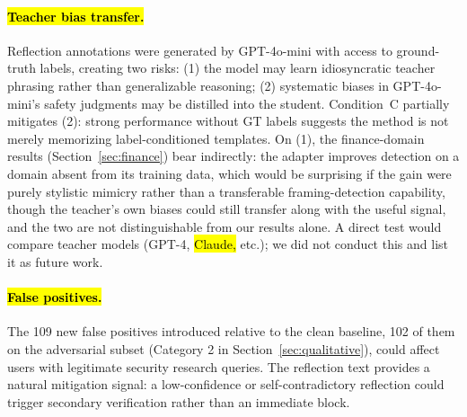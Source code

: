 \documentclass[superintelligence,article,accept,moreauthors]{Definitions/mdpi}
\begin{document}
\paragraph{\hl{Teacher bias transfer.} %
}
Reflection annotations were generated by GPT-4o-mini with access to ground-truth labels, creating two risks: (1) the model may learn idiosyncratic teacher phrasing rather than generalizable reasoning; (2) systematic biases in GPT-4o-mini's safety judgments may be distilled into the student. Condition~C partially mitigates (2): strong performance without GT labels suggests the method is not merely memorizing label-conditioned templates. On (1), the finance-domain results (Section~\ref{sec:finance}) bear indirectly: the adapter improves detection on a domain absent from its training data, which would be surprising if the gain were purely stylistic mimicry rather than a transferable framing-detection capability, though the teacher's own biases could still transfer along with the useful signal, and the two are not distinguishable from our results alone. A direct test would compare teacher models (GPT-4, \hl{Claude,} %
 etc.); we did not conduct this and list it as future work.

\paragraph{\hl{False positives.}}
The 109 new false positives introduced relative to the clean baseline, 102 of them on the adversarial subset (Category 2 in Section~\ref{sec:qualitative}), could affect users with legitimate security research queries. The reflection text provides a natural mitigation signal: a low-confidence or self-contradictory reflection could trigger secondary verification rather than an immediate block.
\end{document}
